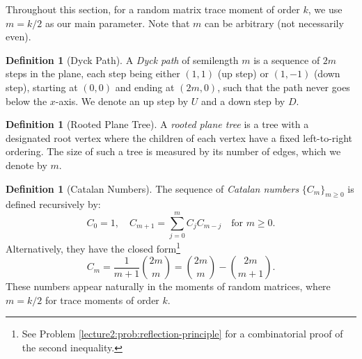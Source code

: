\documentclass[letterpaper,11pt,oneside,reqno]{book}
\numberwithin{equation}{chapter}  %
\theoremstyle{definition}
\newtheorem{definition}[proposition]{Definition}
\begin{document}
Throughout this section, for a random matrix trace moment of order $k$,
we use $m=k/2$ as our main parameter. Note that $m$ can be arbitrary
(not necessarily even).

\begin{definition}[Dyck Path]
A \emph{Dyck path} of semilength $m$ is a sequence of $2m$ steps in the plane, each step being either $(1,1)$ (up step) or $(1,-1)$ (down step), starting at $(0,0)$ and ending at $(2m,0)$, such that the path never goes below the $x$-axis. We denote an up step by $U$ and a down step by $D$.
\end{definition}

\begin{definition}[Rooted Plane Tree]
A \emph{rooted plane tree} is a tree with a designated root vertex where the children of each vertex have a fixed left-to-right ordering. The size of such a tree is measured by its number of edges, which we denote by $m$.
\end{definition}

\begin{definition}[Catalan Numbers]
The sequence of \emph{Catalan numbers} $\{C_m\}_{m\geq 0}$ is defined recursively by:
\begin{equation}
	\label{lecture2:eq:catalan-recurrence}
    C_0 = 1, \quad C_{m+1} = \sum_{j=0}^m C_j C_{m-j} \quad \text{for } m \geq 0.
\end{equation}
Alternatively, they have the closed form\footnote{See
	Problem \ref{lecture2:prob:reflection-principle} for a combinatorial proof
of the second inequality.}
\begin{equation}
	\label{lecture2:eq:catalan-closed}
    C_m = \frac{1}{m+1}\binom{2m}{m} =
		\binom{2m}{m} - \binom{2m}{m+1}.
\end{equation}
These numbers appear naturally in the moments of random matrices, where $m=k/2$ for trace moments of order $k$.
\end{definition}
\end{document}
